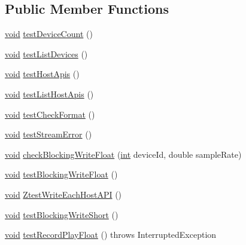 \subsection*{Public Member Functions}
\begin{DoxyCompactItemize}
\item 
\hyperlink{sound_8c_ae35f5844602719cf66324f4de2a658b3}{void} \hyperlink{classcom_1_1portaudio_1_1_test_basic_a525b6127e55b3e9cf63f400ea6429755}{test\+Device\+Count} ()
\item 
\hyperlink{sound_8c_ae35f5844602719cf66324f4de2a658b3}{void} \hyperlink{classcom_1_1portaudio_1_1_test_basic_aa2ea5be500e872b35fe78b290f6af71a}{test\+List\+Devices} ()
\item 
\hyperlink{sound_8c_ae35f5844602719cf66324f4de2a658b3}{void} \hyperlink{classcom_1_1portaudio_1_1_test_basic_a4e91a283566c2b7a74c9f727798716ff}{test\+Host\+Apis} ()
\item 
\hyperlink{sound_8c_ae35f5844602719cf66324f4de2a658b3}{void} \hyperlink{classcom_1_1portaudio_1_1_test_basic_af74af0c9745101b563d3485d45a30bb1}{test\+List\+Host\+Apis} ()
\item 
\hyperlink{sound_8c_ae35f5844602719cf66324f4de2a658b3}{void} \hyperlink{classcom_1_1portaudio_1_1_test_basic_ab39d2fdb984fd87901732ecb5ee60616}{test\+Check\+Format} ()
\item 
\hyperlink{sound_8c_ae35f5844602719cf66324f4de2a658b3}{void} \hyperlink{classcom_1_1portaudio_1_1_test_basic_a58cde67014d83f92f8e37ab76a774d8f}{test\+Stream\+Error} ()
\item 
\hyperlink{sound_8c_ae35f5844602719cf66324f4de2a658b3}{void} \hyperlink{classcom_1_1portaudio_1_1_test_basic_a9de64aec3645f9ecd53f39f90a750c80}{check\+Blocking\+Write\+Float} (\hyperlink{xmltok_8h_a5a0d4a5641ce434f1d23533f2b2e6653}{int} device\+Id, double sample\+Rate)
\item 
\hyperlink{sound_8c_ae35f5844602719cf66324f4de2a658b3}{void} \hyperlink{classcom_1_1portaudio_1_1_test_basic_aabb5f08a8b5b68698e5d483747a74bc9}{test\+Blocking\+Write\+Float} ()
\item 
\hyperlink{sound_8c_ae35f5844602719cf66324f4de2a658b3}{void} \hyperlink{classcom_1_1portaudio_1_1_test_basic_aae0b43d5d561dc9eb4a3b66a6d06558b}{Ztest\+Write\+Each\+Host\+A\+PI} ()
\item 
\hyperlink{sound_8c_ae35f5844602719cf66324f4de2a658b3}{void} \hyperlink{classcom_1_1portaudio_1_1_test_basic_a8aa47f0977bb74a1f6dc6280e88e1c8b}{test\+Blocking\+Write\+Short} ()
\item 
\hyperlink{sound_8c_ae35f5844602719cf66324f4de2a658b3}{void} \hyperlink{classcom_1_1portaudio_1_1_test_basic_a6acf70aac9b4c1948c4f81a776b25ec3}{test\+Record\+Play\+Float} ()  throws Interrupted\+Exception 	

\end{DoxyCompactItemize}

